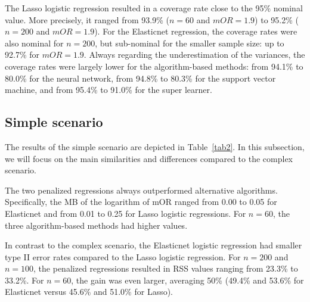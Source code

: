 \documentclass{article}
\begin{document}
The Lasso logistic regression resulted in a  coverage rate close to the 95\% nominal value. More precisely,  it ranged from 93.9\% ($n=60$ and $mOR = 1.9$) to 95.2\% ($n=200$ and $mOR = 1.9$).   For the Elasticnet regression,  the coverage rates were also nominal for $n=200$,  but sub-nominal for the smaller sample size: up to 92.7\% for $mOR = 1.9$.  Always regarding the underestimation of the variances, the coverage rates were largely lower for the algorithm-based methods: from 94.1\% to 80.0\% for the neural network,  from 94.8\% to 80.3\% for the support vector machine,  and from 95.4\% to  91.0\% for the super learner.



\subsection{Simple scenario}
The results of the simple scenario are depicted in Table~\ref{tab2}. In this subsection, we will focus on the main similarities and differences compared to the complex scenario.


The two penalized regressions always outperformed alternative algorithms. Specifically, the MB of the logarithm of mOR ranged from 0.00 to 0.05 for Elasticnet and from 0.01 to 0.25 for Lasso logistic regressions. For $n=60$, the three algorithm-based methods had higher values. 




In contrast to the complex scenario, the Elasticnet logistic regression had smaller type II error rates compared to the Lasso logistic regression.
For $n=200$ and $n=100$, the penalized regressions resulted in RSS values ranging from 23.3\% to 33.2\%. For $n=60$, the gain was even larger, averaging 50\%  (49.4\% and 53.6\% for Elasticnet versus 45.6\% and 51.0\% for Lasso).
\end{document}
